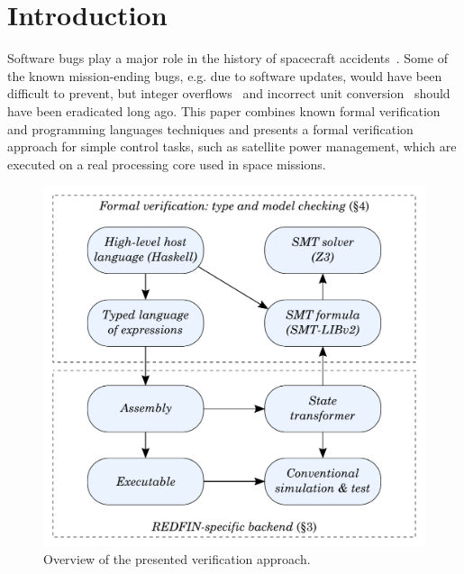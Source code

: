 \section{Introduction}\label{sec-intro}

Software bugs play a major role in the history of spacecraft
accidents~\cite{Leveson2004}. Some of the known mission-ending bugs, e.g. due to
software updates, would have been difficult to prevent, but integer
overflows~\cite{bug-rocket} and incorrect unit conversion~\cite{NASA:1999:Mars}
should have been eradicated long ago.
This paper combines known formal verification and programming languages
techniques and presents a formal verification approach for simple control tasks,
such as satellite power management, which are executed on a real processing core
used in space missions.



\begin{figure}
\centerline{\includegraphics[scale=0.42]{fig/overview.pdf}}
\vspace{-2mm}
\caption{Overview of the presented verification approach.\label{fig-overview}}
\vspace{-3mm}
\end{figure}

